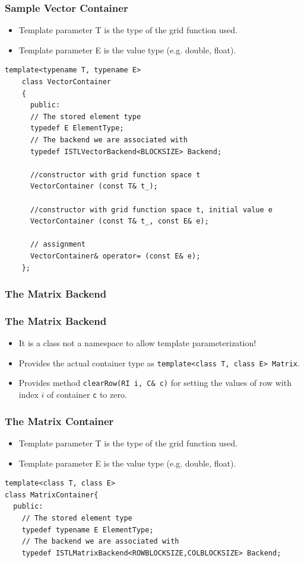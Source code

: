 {\begin{frame}[fragile]
  \frametitle{Sample Vector Container}
  \begin{itemize}
  \item Template parameter T is the type of the grid function used.
  \item Template parameter E is the value type (e.g. double, float).
  \end{itemize}
  \begin{lstlisting}[basicstyle=\scriptsize]
    template<typename T, typename E>
    class VectorContainer 
    {
      public:
      // The stored element type
      typedef E ElementType;
      // The backend we are associated with
      typedef ISTLVectorBackend<BLOCKSIZE> Backend;
      
      //constructor with grid function space t
      VectorContainer (const T& t_);

      //constructor with grid function space t, initial value e
      VectorContainer (const T& t_, const E& e);
      
      // assignment
      VectorContainer& operator= (const E& e);
    };
  \end{lstlisting}
\end{frame}
\subsubsection{The Matrix Backend}
\label{sec:vector-backend}

\begin{frame}
  \frametitle<presentation>{The Matrix Backend}
  \begin{itemize}
  \item It is a class not a namespace to allow template
    parameterization!
  \item Provides the actual container type as
    \lstinline!template<class T, class E> Matrix!.
  \item Provides method \lstinline!clearRow(RI i, C& c)! for setting
    the values of row with index $i$ of container \lstinline!c! to zero.
  \end{itemize}
\end{frame}

\begin{frame}[fragile]
  \frametitle{The Matrix Container}
\begin{itemize}
  \item Template parameter T is the type of the grid function used.
  \item Template parameter E is the value type (e.g. double, float).
  \end{itemize}
  \begin{lstlisting}[basicstyle=\scriptsize]
template<class T, class E>
class MatrixContainer{
  public:
    // The stored element type
    typedef typename E ElementType;
    // The backend we are associated with
    typedef ISTLMatrixBackend<ROWBLOCKSIZE,COLBLOCKSIZE> Backend;
      

\end{lstlisting}
\end{frame}}
